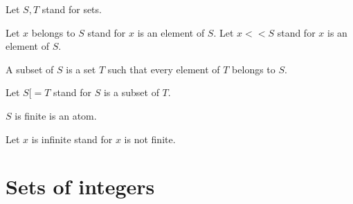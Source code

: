 \documentclass{document}
\begin{document}
  \begin{forthel}

    Let $S,T$ stand for sets.

    Let $x$ belongs to $S$ stand for $x$ is an element of $S$.
    Let $x << S$ stand for $x$ is an element of $S$.

    \begin{definition}[Subset]
      A subset of $S$ is a set $T$ such that every element of $T$ belongs to $S$.
    \end{definition}

    Let $S [= T$ stand for $S$ is a subset of $T$.

    \begin{signature}[FinSet]
      $S$ is finite is an atom.
    \end{signature}

    Let $x$ is infinite stand for $x$ is not finite.
  \end{forthel}


  \section{Sets of integers}
\end{document}
